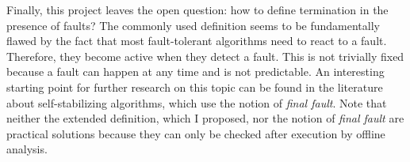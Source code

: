 Finally, this project leaves the open question: how to define termination in the presence of faults?
The commonly used definition seems to be fundamentally flawed by the fact that most fault-tolerant algorithms need to react to a fault.
Therefore, they become active when they detect a fault.
This is not trivially fixed because a fault can happen at any time and is not predictable.
An interesting starting point for further research on this topic can be found in the literature about self-stabilizing algorithms, which use the notion of \textit{final fault}.
Note that neither the extended definition, which I proposed, nor the notion of \textit{final fault} are practical solutions because they can only be checked after execution by offline analysis.